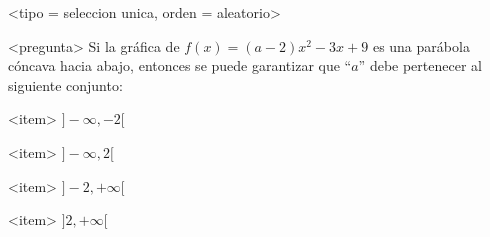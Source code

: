 <tipo = seleccion unica, orden = aleatorio>

<pregunta>
Si la gr\'afica de $f(x) = (a -2)x^2-3x +9$ es una par\'abola c\'oncava hacia abajo, entonces se puede garantizar que ``$a$'' debe pertenecer al siguiente conjunto:


<item>
$]{-}\infty, -2[$

<item>
$]{-}\infty, 2[$

<item>
$]-2, +\infty[$

<item>
$]2, +\infty[$



